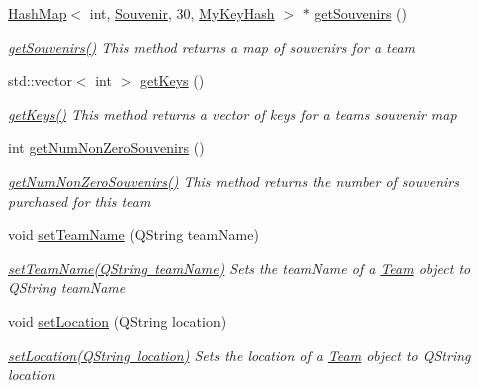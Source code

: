 \begin{DoxyCompactItemize}
\mbox{\hyperlink{class_hash_map}{Hash\+Map}}$<$ int, \mbox{\hyperlink{class_souvenir}{Souvenir}}, 30, \mbox{\hyperlink{struct_my_key_hash}{My\+Key\+Hash}} $>$ $\ast$ \mbox{\hyperlink{class_team_a1f677711d70b0efedde0c24445813dc2}{get\+Souvenirs}} ()
\begin{DoxyCompactList}\small\item\em \mbox{\hyperlink{class_team_a1f677711d70b0efedde0c24445813dc2}{get\+Souvenirs()}} This method returns a map of souvenirs for a team \end{DoxyCompactList}\item 
std\+::vector$<$ int $>$ \mbox{\hyperlink{class_team_ab7ed1cd5a51fb12b70e029bf50336050}{get\+Keys}} ()
\begin{DoxyCompactList}\small\item\em \mbox{\hyperlink{class_team_ab7ed1cd5a51fb12b70e029bf50336050}{get\+Keys()}} This method returns a vector of keys for a team\textquotesingle{}s souvenir map \end{DoxyCompactList}\item 
int \mbox{\hyperlink{class_team_a369e1504be751aa8bf1445a69901e9da}{get\+Num\+Non\+Zero\+Souvenirs}} ()
\begin{DoxyCompactList}\small\item\em \mbox{\hyperlink{class_team_a369e1504be751aa8bf1445a69901e9da}{get\+Num\+Non\+Zero\+Souvenirs()}} This method returns the number of souvenirs purchased for this team \end{DoxyCompactList}\item 
void \mbox{\hyperlink{class_team_a1ea161f9bcc465d45a8ca2603590739e}{set\+Team\+Name}} (Q\+String team\+Name)
\begin{DoxyCompactList}\small\item\em \mbox{\hyperlink{class_team_a1ea161f9bcc465d45a8ca2603590739e}{set\+Team\+Name(\+Q\+String team\+Name)}} Sets the team\+Name of a \mbox{\hyperlink{class_team}{Team}} object to Q\+String team\+Name \end{DoxyCompactList}\item 
void \mbox{\hyperlink{class_team_a50b52da7424bde42a2bfad0c1e9bce9c}{set\+Location}} (Q\+String location)
\begin{DoxyCompactList}\small\item\em \mbox{\hyperlink{class_team_a50b52da7424bde42a2bfad0c1e9bce9c}{set\+Location(\+Q\+String location)}} Sets the location of a \mbox{\hyperlink{class_team}{Team}} object to Q\+String location \end{DoxyCompactList}\item 

\end{DoxyCompactItemize}
